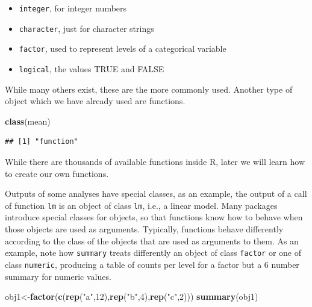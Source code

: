 \documentclass[
]{article}
\newenvironment{Shaded}{\begin{snugshade}}{\end{snugshade}}
\newcommand{\DecValTok}[1]{\textcolor[rgb]{0.00,0.00,0.81}{#1}}
\newcommand{\FunctionTok}[1]{\textcolor[rgb]{0.13,0.29,0.53}{\textbf{#1}}}
\newcommand{\NormalTok}[1]{#1}
\newcommand{\OtherTok}[1]{\textcolor[rgb]{0.56,0.35,0.01}{#1}}
\newcommand{\StringTok}[1]{\textcolor[rgb]{0.31,0.60,0.02}{#1}}
\providecommand{\tightlist}{%
  \setlength{\itemsep}{0pt}\setlength{\parskip}{0pt}}
\begin{document}
\begin{itemize}
\tightlist
\item
  \texttt{integer}, for integer numbers
\item
  \texttt{character}, just for character strings
\item
  \texttt{factor}, used to represent levels of a categorical variable
\item
  \texttt{logical}, the values TRUE and FALSE
\end{itemize}

While many others exist, these are the more commonly used. Another type
of object which we have already used are functions.

\begin{Shaded}
\begin{Highlighting}[]
\FunctionTok{class}\NormalTok{(mean)}
\end{Highlighting}
\end{Shaded}

\begin{verbatim}
## [1] "function"
\end{verbatim}

While there are thousands of available functions inside R, later we will
learn how to create our own functions.

Outputs of some analyses have special classes, as an example, the output
of a call of function \texttt{lm} is an object of class \texttt{lm},
i.e., a linear model. Many packages introduce special classes for
objects, so that functions know how to behave when those objects are
used as arguments. Typically, functions behave differently according to
the class of the objects that are used as arguments to them. As an
example, note how \texttt{summary} treats differently an object of class
\texttt{factor} or one of class \texttt{numeric}, producing a table of
counts per level for a factor but a 6 number summary for numeric values.

\begin{Shaded}
\begin{Highlighting}[]
\NormalTok{obj1}\OtherTok{\textless{}{-}}\FunctionTok{factor}\NormalTok{(}\FunctionTok{c}\NormalTok{(}\FunctionTok{rep}\NormalTok{(}\StringTok{"a"}\NormalTok{,}\DecValTok{12}\NormalTok{),}\FunctionTok{rep}\NormalTok{(}\StringTok{"b"}\NormalTok{,}\DecValTok{4}\NormalTok{),}\FunctionTok{rep}\NormalTok{(}\StringTok{"c"}\NormalTok{,}\DecValTok{2}\NormalTok{)))}
\FunctionTok{summary}\NormalTok{(obj1)}
\end{Highlighting}
\end{Shaded}
\end{document}
